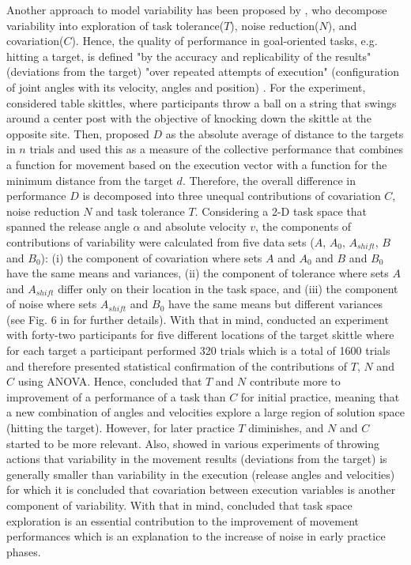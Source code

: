 Another approach to model variability has been proposed by \cite{muller2004},
who decompose variability into exploration of 
task tolerance($T$), noise reduction($N$), and covariation($C$).
Hence, the quality of performance in 
goal-oriented tasks, 
e.g. hitting a target, is defined "by the accuracy and replicability of the 
results" (deviations from the target) "over repeated attempts of execution" 
(configuration of joint angles with its velocity, angles and position)
\citep[p. 229]{muller2004}.
For the experiment, \cite{muller2004} considered table skittles, 
where participants throw a ball on a string that swings around 
a center post with the objective of knocking down the skittle at the 
opposite site.
Then, \cite{muller2004} proposed $D$ as the absolute average of distance to
the targets in $n$ trials and used this as a measure of the collective 
performance that combines a function for movement based on the 
execution vector with a function for the minimum distance from the target $d$.
Therefore, the overall difference in performance $D$ is decomposed
into three unequal contributions of covariation $C$, 
noise reduction $N$ and task tolerance $T$.
Considering a 2-D task space that spanned the release angle $\alpha$
and absolute velocity $v$, the components of contributions of
variability were calculated from five data sets 
($A$, $A_0$, $A_{shift}$, $B$ and $B_0$):
(i) the component of covariation where sets $A$ and $A_0$ and $B$ and $B_0$ 
have the same means and variances,
(ii) the component of tolerance where sets $A$ and $A_{shift}$ differ only on
their location in the task space, and 
(iii) the component of noise where sets $A_{shift}$ and $B_0$ have the same
means but different variances 
(see Fig. 6 in \cite{muller2004} for further details).
With that in mind, \cite{muller2004} conducted an experiment with 
forty-two participants for five different locations of the target 
skittle where for each target a participant performed 320 trials which is a 
total of 1600 trials and therefore presented statistical confirmation of the 
contributions of $T$, $N$ and $C$ using ANOVA. Hence, \cite{muller2004} 
concluded that $T$ and $N$ contribute more to improvement of a 
performance of a task than $C$ for initial practice, 
meaning that a new combination of angles and velocities explore a 
large region of solution space (hitting the target).
However, for later practice $T$ diminishes, and $N$ and $C$ started to 
be more relevant.
Also, \cite{muller2004} showed in various experiments of throwing actions
that variability in the movement results (deviations from the target) 
is generally smaller than variability in the execution
(release angles and velocities) for which 
it is concluded that covariation between execution variables
is another component of variability.
With that in mind, \cite{muller2004} concluded that task space exploration 
is an essential  contribution to the improvement of movement performances
which is an explanation to the increase of noise in early practice phases.

